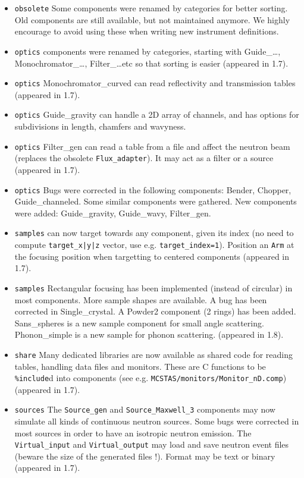 \begin{itemize}
\item \texttt{obsolete} Some components were renamed by categories for better sorting. Old components are still available, but not maintained anymore. We highly encourage to avoid using these when writing new instrument definitions. 
\item \texttt{optics} components were renamed by categories, starting with
   Guide\_\ldots, Monochromator\_\ldots, Filter\_\ldots etc so that sorting is
   easier (appeared in 1.7). 
\item \texttt{optics} Monochromator\_curved can read reflectivity and transmission tables (appeared in 1.7).   
\item \texttt{optics} Guide\_gravity can handle a 2D array of channels, and
    has options for subdivisions in length, chamfers and wavyness.
\item \texttt{optics} Filter\_gen can read a table from a file and affect the neutron
    beam (replaces the obsolete \verb+Flux_adapter+). It may act as a filter or a
    source (appeared in 1.7).    
\item \texttt{optics} Bugs were corrected in the following components: Bender, Chopper, Guide\_channeled. Some similar components were gathered. New components were added: Guide\_gravity, Guide\_wavy, Filter\_gen. 
\item \texttt{samples} can now target towards any component, given its index 
    (no need to compute \verb+target_x|y|z+ vector, use e.g. \verb+target_index=1+). 
    Position an \verb+Arm+ at the focusing position when targetting to 
    centered components (appeared in 1.7). 
\item \texttt{samples} Rectangular focusing has been implemented
  (instead of circular) in most components. More sample shapes are
  available. A bug has been corrected in Single\_crystal. A Powder2
  component (2 rings) has been added. Sans\_spheres is a new sample
  component for small angle scattering. Phonon\_simple is a new sample
  for phonon scattering. (appeared in 1.8). 
\item \texttt{share} Many dedicated libraries are now available as shared code for reading tables,
    handling data files and monitors. These are C functions to be \texttt{\%include}d
    into components (see e.g. \verb+MCSTAS/monitors/Monitor_nD.comp+) (appeared in 1.7).
\item \texttt{sources} The \verb+Source_gen+ and \verb+Source_Maxwell_3+ components may now simulate all kinds of continuous neutron sources. Some bugs were corrected in most sources in order to have an isotropic neutron emission. The \verb+Virtual_input+ and \verb+Virtual_output+ may load and save neutron event files (beware the size of the generated files !). Format may be text or binary (appeared in 1.7). 
\end{itemize}

